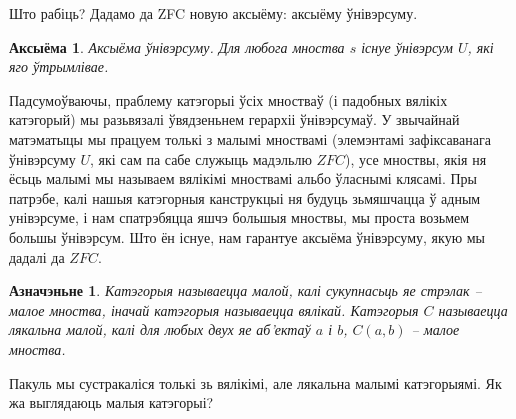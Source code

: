 \documentclass[a4paper,12pt]{book}
\newtheorem{definition}{Азначэньне}[section]
\newtheorem{axiom}{Аксыёма}[section]
\begin{document}
Што рабіць? Дадамо да ZFC новую аксыёму: аксыёму ўнівэрсуму.

\begin{axiom}
  Аксыёма ўнівэрсуму. Для любога мноства $s$ існуе ўнівэрсум $U$, які яго ўтрымлівае.
\end{axiom}

Падсумоўваючы, праблему катэгорыі ўсіх мностваў (і падобных вялікіх
катэгорый) мы разьвязалі ўвядзеньнем герархіі ўнівэрсумаў. У звычайнай
матэматыцы мы працуем толькі з малымі мноствамі (элемэнтамі
зафіксаванага ўнівэрсуму $U$, які сам па сабе служыць мадэльлю $ZFC$),
усе мноствы, якія ня
ёсьць малымі мы называем вялікімі мноствамі альбо ўласнымі клясамі. Пры
патрэбе, калі нашыя катэгорныя канструкцыі ня будуць зьмяшчацца ў
адным унівэрсуме, і нам спатрэбяцца яшчэ большыя мноствы, мы проста
возьмем большы ўнівэрсум. Што ён існуе, нам гарантуе аксыёма
ўнівэрсуму, якую мы дадалі да $ZFC$.

\begin{definition}
  Катэгорыя называецца малой, калі сукупнасьць яе стрэлак -- малое
  мноства, іначай катэгорыя называецца вялікай. Катэгорыя $C$ называецца
  лякальна малой, калі для любых двух яе аб'ектаў $a$ і $b$, $C(a, b)$
  -- малое мноства.
\end{definition}

Пакуль мы сустракаліся толькі зь вялікімі, але лякальна малымі катэгорыямі. Як жа выглядаюць
малыя катэгорыі?
\end{document}
